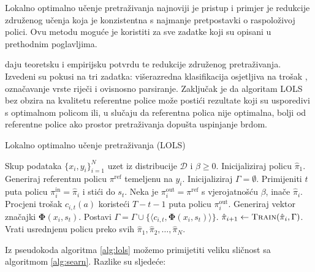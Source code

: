 Lokalno optimalno učenje pretraživanja 
najnoviji je pristup i primjer je redukcije združenog učenja koja je
konzistentna s najmanje pretpostavki o raspoloživoj polici. Ovu metodu moguće je
koristiti za sve zadatke koji su opisani u prethodnim poglavljima.

\cite{daume15lols} daju teoretsku i empirijsku potvrdu te redukcije združenog
pretraživanja. Izvedeni su pokusi na tri zadatka: višerazredna klasifikacija
osjetljiva na trošak ,
označavanje vrste riječi i ovisnosno parsiranje. Zaključak je da algoritam
\textsc{LOLS} bez obzira na kvalitetu referentne police može postići rezultate
koji su usporedivi s optimalnom policom ili, u slučaju da referentna polica nije
optimalna, bolji od referentne police ako prostor pretraživanja dopušta
uspinjanje brdom.

\begin{algorithm}
\caption{Lokalno optimalno učenje pretraživanja (\textsc{LOLS})}\label{alg:lols}
\begin{algorithmic}[1]
\Require Skup podataka $\{x_i, y_i\}_{i=1}^N$ uzet iz distribucije $\mathcal{D}$
         i $\beta \geq 0$. %
\State Inicijaliziraj policu $\hat{\pi}_1$.
  \State Generiraj referentnu policu $\pi^{\text{ref}}$ temeljenu na $y_i$.
  \State Inicijaliziraj $\Gamma = \emptyset$. 
    \State Primijeniti $t$ puta policu $\pi_{i}^{\text{in}} = \hat{\pi}_i$  i stići do $s_t$.  \label{alg:lols:learned}
      \State Neka je  $\pi_{i}^{\text{out}} = \pi^{\text{ref}}$ s vjerojatnošću $\beta$, inače $\hat{\pi}_i$.
      \State Procjeni trošak $c_{i,t}(a)$ koristeći $T-t-1$ puta policu $\pi_{i}^{\text{out}}$.  \label{alg:lols:mixture}
    \EndFor
    \State Generiraj vektor značajki $\mathbf{\Phi}(x_i, s_t)$.
    \State Postavi $\Gamma = \Gamma \cup \{\langle c_{i,t}, \mathbf{\Phi}(x_i, s_t) \rangle\}$.
  \EndFor
  \State $\hat{\pi}_{i+1} \gets \textsc{Train}(\hat{\pi}_i, \Gamma)$.
\EndFor
\State Vrati usrednjenu policu preko svih $\hat{\pi}_1, \hat{\pi}_2, \ldots, \hat{\pi}_N$.
\end{algorithmic}
\end{algorithm}

Iz pseudokoda algoritma \ref{alg:lols} možemo primijetiti veliku sličnost sa
algoritmom \ref{alg:searn}. Razlike su sljedeće:

